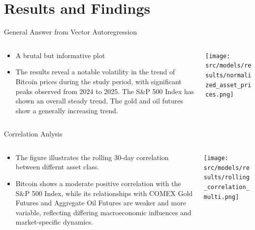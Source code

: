 \section{Results and Findings}
    \begin{frame}{General Answer from Vector Autoregression}
        \begin{columns}
        \begin{column}{0.5\textwidth}
        \begin{itemize}
            \item<1-> A brutal but informative plot
            \item<2->The results reveal a notable volatility in the trend of Bitcoin prices during the study period, with significant peaks observed from 2024 to 2025. The S\&P 500 Index has shown an overall steady trend. The gold and oil futures show a generally increasing trend.
            
        \end{itemize}
        \end{column}
        \begin{column}{0.5\textwidth}  %
            \begin{center}
             \texttt{[image: src/models/results/normalized\_asset\_prices.png]}
             \end{center}
        \end{column}
        \end{columns}
    \end{frame}

    \begin{frame}{Correlation Anlysis}
        \begin{columns}
        \begin{column}{0.5\textwidth}
        \begin{itemize}
            \item<1-> The figure illustrates the rolling 30-day correlation between differnt asset class.
            \item<2-> Bitcoin shows a moderate positive correlation with the S\&P 500 Index, while its relationships with COMEX Gold Futures and Aggregate Oil Futures are weaker and more variable, reflecting differing macroeconomic influences and market-specific dynamics.
           
        \end{itemize}
        \end{column}
        \begin{column}{0.6\textwidth}  %
            \begin{center}
             \texttt{[image: src/models/results/rolling\_correlation\_multi.png]}
             \end{center}
        \end{column}
        \end{columns}
    \end{frame}

